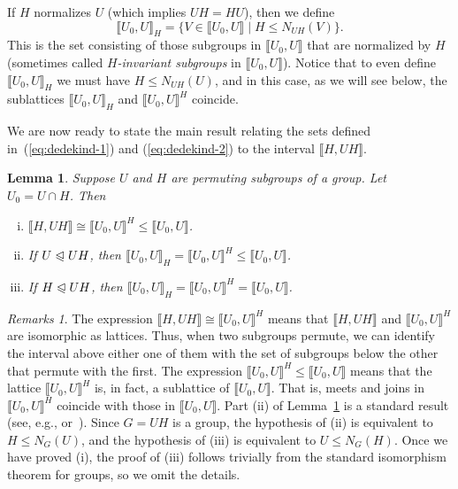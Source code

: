 \documentclass{gen-j-l}
\newcommand{\lb}{\ensuremath{\llbracket}}
\newcommand{\rb}{\ensuremath{\rrbracket}}
\newcommand{\<}{\ensuremath{\langle}}
\renewcommand{\>}{\ensuremath{\rangle}}
\theoremstyle{plain}
\newtheorem{lemma}[theorem]{Lemma}
\theoremstyle{definition}
\theoremstyle{remark}
\newtheorem*{remarks}{Remarks}
\numberwithin{theorem}{section}
\numberwithin{claim}{section}
\numberwithin{equation}{section}
\numberwithin{conjecture}{section}
\renewcommand{\leq}{\ensuremath{\leqslant}}
\newcommand{\subnormal}{\ensuremath{\trianglelefteqslant}}
\newcommand{\2}{\ensuremath{\mathbf{2}}}
\newcommand{\3}{\ensuremath{\mathbf{3}}}
\begin{document}
If $H$ normalizes $U$ (which implies $UH=HU$), 
then we %
define
\begin{equation}
  \label{eq:dedekind-2}
\lb U_0, U \rb_H = \{ V\in \lb U_0,U \rb \mid H\leq N_{UH}(V)\}.
\end{equation}
This is the set consisting of those subgroups in $\lb U_0, U \rb$ that
are normalized by $H$ (sometimes called 
\emph{$H$-invariant subgroups} in $\lb U_0,U \rb$).
Notice that to even
define $\lb U_0, U \rb_H$ we must have $H\leq N_{UH}(U)$, and in this case, as we will
see below, the sublattices 
$\lb U_0, U \rb_H$ and $\lb U_0, U \rb^H$ coincide.

We are now ready to state the main result relating the sets defined
in~(\ref{eq:dedekind-1}) and (\ref{eq:dedekind-2}) %
to the interval $\lb H, UH \rb$.
\begin{lemma}
  \label{lemma-wjd-4}
Suppose $U$ and $H$ are permuting subgroups of a group. %
Let $U_0 = U\cap H$.  Then
\begin{enumerate}[(i)]
\item $\lb H, UH \rb  \cong  \lb U_0, U \rb^H \leq \lb U_0, U \rb$.
\item If $U \subnormal UH$, then  $\lb U_0, U \rb_H  = \lb U_0, U \rb^H \leq \lb U_0, U \rb$.
\item If $H \subnormal UH$,  then  $\lb U_0, U \rb_H  = \lb U_0, U \rb^H = \lb U_0, U \rb$.
\end{enumerate}
\end{lemma}
\begin{remarks}
The expression $\lb H, UH \rb  \cong  \lb U_0, U \rb^H$ means
that $\lb H, UH \rb$ and $\lb U_0, U \rb^H$ are isomorphic as lattices. Thus,
when two subgroups permute, we can identify the interval above either one of 
them with the set of subgroups below the other that permute with the first.  
The expression $\lb U_0, U \rb^H \leq \lb U_0, U \rb$ means that
the lattice $\lb U_0, U \rb^H$ is, in fact, a sublattice of 
$\lb U_0, U \rb$. That is, meets and joins in
$\lb U_0, U \rb^H$ coincide with those in $\lb U_0, U \rb$.
Part (ii) of Lemma~\ref{lemma-wjd-4} is a standard result (see, e.g.,
\cite{Borner:1999} or~\cite{Isaacs:2008}).
Since $G=UH$ is a group, the hypothesis of (ii) is equivalent to
$H\leq N_G(U)$, and the hypothesis of (iii) is equivalent to $U\leq N_G(H)$.
Once we have proved (i), the
proof of (iii) follows trivially from the standard isomorphism theorem for
groups, so we omit the details.
\end{remarks}
\end{document}
